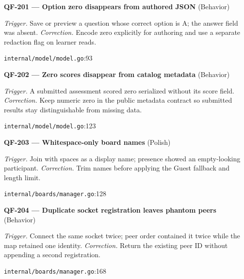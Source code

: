 \begin{minipage}{\linewidth}
\textbf{QF-201 --- Option zero disappears from authored JSON} {\scriptsize\color{accent}(Behavior)}\par
\textit{Trigger.} Save or preview a question whose correct option is A; the answer field was absent. \textit{Correction.} Encode zero explicitly for authoring and use a separate redaction flag on learner reads.\par
{\scriptsize\color{muted}\nolinkurl{internal/model/model.go}:93}\par
\end{minipage}\par\vspace{7pt}
\begin{minipage}{\linewidth}
\textbf{QF-202 --- Zero scores disappear from catalog metadata} {\scriptsize\color{accent}(Behavior)}\par
\textit{Trigger.} A submitted assessment scored zero serialized without its score field. \textit{Correction.} Keep numeric zero in the public metadata contract so submitted results stay distinguishable from missing data.\par
{\scriptsize\color{muted}\nolinkurl{internal/model/model.go}:123}\par
\end{minipage}\par\vspace{7pt}
\begin{minipage}{\linewidth}
\textbf{QF-203 --- Whitespace-only board names} {\scriptsize\color{accent}(Polish)}\par
\textit{Trigger.} Join with spaces as a display name; presence showed an empty-looking participant. \textit{Correction.} Trim names before applying the Guest fallback and length limit.\par
{\scriptsize\color{muted}\nolinkurl{internal/boards/manager.go}:128}\par
\end{minipage}\par\vspace{7pt}
\begin{minipage}{\linewidth}
\textbf{QF-204 --- Duplicate socket registration leaves phantom peers} {\scriptsize\color{accent}(Behavior)}\par
\textit{Trigger.} Connect the same socket twice; peer order contained it twice while the map retained one identity. \textit{Correction.} Return the existing peer ID without appending a second registration.\par
{\scriptsize\color{muted}\nolinkurl{internal/boards/manager.go}:168}\par
\end{minipage}\par\vspace{7pt}
